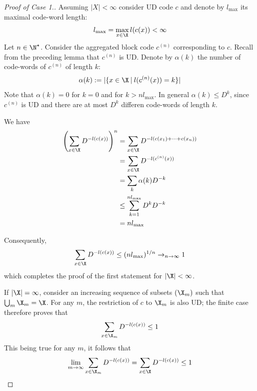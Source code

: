 \documentclass[toc, titlepaged]{../cs-classes/cs-classes}
\begin{document}
\begin{proof}[Proof of Case 1.]
    Assuming $|X|<\infty$ consider UD code $c$ and denote by $l_{\max}$ its maximal code-word length:
    \begin{equation*}
        l_{\max}=\max_{x\in\X} l(c(x)) <\infty
    \end{equation*}
    Let $n\in\N^\star$. Consider the aggregated block code $c^{(n)}$ corresponding to $c$. Recall from the preceding lemma that $c^{(n)}$ is UD. Denote by $\alpha(k)$ the number of code-words of $c^{(n)}$ of length $k$:
    \begin{equation*}
        \alpha(k) := |\{x\in\X \: | \: l(c^{(n)}(x)) = k\}|
    \end{equation*}
    Note that $\alpha(k)=0$ for $k=0$ and for $k>nl_{\max}$. In general $\alpha(k)\leq D^k$, since $c^{(n)}$ is UD and there are at most $D^k$ differen code-words of length $k$.

    We have
    \begin{equation*}
        \begin{aligned}
            \left(\sum_{x\in\X} D^{-l(c(x))}\right)^n &= \sum_{x\in\X} D^{-l(c(x_1)+\dots+c(x_n))}\\
            &= \sum_{x\in\X} D^{-l(c^{(n)}(x))}\\
            &= \sum_{k} \alpha(k)D^{-k}\\
            &\leq \sum_{k=1}^{nl_{\max}} D^kD^{-k}\\
            &= nl_{\max}
        \end{aligned}
    \end{equation*}

    Consequently,
    \begin{equation*}
        \sum_{x\in\X} D^{-l(c(x))} \leq (nl_{\max})^{1/n} \to_{n\to\infty} 1
    \end{equation*}
    which completes the proof of the first statement for $|\X|<\infty$.

    If $|\X|=\infty$, consider an increasing sequence of subsets $(\X_m)$ such that $\bigcup_m \X_m = \X$. For any $m$, the restriction of $c$ to $\X_m$ is also UD; the finite case therefore proves that
    \begin{equation*}
        \sum_{x\in\X_m}D^{-l(c(x))}\leq 1
    \end{equation*}
    This being true for any $m$, it follows that 
    \begin{equation*}
        \lim_{m\to\infty}\sum_{x\in\X_m}D^{-l(c(x))} = \sum_{x\in\X}D^{-l(c(x))} \leq 1
    \end{equation*}
\end{proof}
\end{document}

